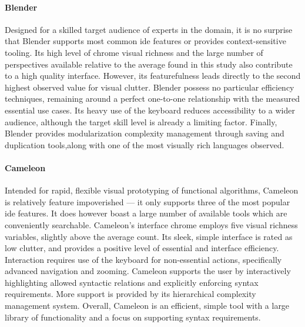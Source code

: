 \paragraph{Blender} Designed for a skilled target audience of experts in
the domain, it is no surprise that Blender supports most common \ac{ide}
features or provides context-sensitive tooling. Its high level of chrome
visual richness and the large number of perspectives available relative to
the average found in this study also contribute to a high quality
interface. However, its featurefulness leads directly to the second highest
observed value for visual clutter. Blender possess no particular efficiency
techniques, remaining around a perfect one-to-one relationship with the
measured essential use cases. Its heavy use of the keyboard reduces
accessibility to a wider audience, although the target skill level is
already a limiting factor. Finally, Blender provides modularization
complexity management through saving and duplication tools,along with one
of the most visually rich languages observed.

\paragraph{Cameleon} Intended for rapid, flexible visual prototyping of
functional algorithms, Cameleon is relatively feature impoverished --- it
only supports three of the most popular \ac{ide} features. It does however
boast a large number of available tools which are conveniently searchable.
Cameleon's interface chrome employs five visual richness variables,
slightly above the average count. Its sleek, simple interface is rated as
low clutter, and provides a positive level of essential and interface
efficiency. Interaction requires use of the keyboard for non-essential
actions, specifically advanced navigation and zooming. Cameleon supports
the user by interactively highlighting allowed syntactic relations and
explicitly enforcing syntax requirements. More support is provided by its
hierarchical complexity management system. Overall, Cameleon is an
efficient, simple tool with a large library of functionality and a focus on
supporting syntax requirements.

